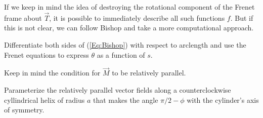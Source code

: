 \documentclass{ximera}
\begin{document}
If we keep in mind the idea of destroying the rotational component of the Frenet frame about $\overrightarrow{T}$, it is possible to immediately describe all such functions $f$. But if this is not clear, we can follow Bishop and take a more computational approach. 

\begin{exercise}  \label{E:dfstr35tr43}
Differentiate both sides of (\ref{Eq:Bishop}) with respect to arclength and use the Frenet equations to express $\theta$ as a function of $s$.

\begin{hint}
Keep in mind the condition for $\overrightarrow{M}$ to be relatively parallel. 
\end{hint}
\end{exercise}

\begin{exercise}  \label{E:MDnfddd}
Parameterize the relatively parallel vector fields along a counterclockwise cyllindrical helix of radius $a$ that makes the angle $\pi/2 - \phi$ with the cylinder's axis of symmetry.
\end{exercise}
\end{document}
